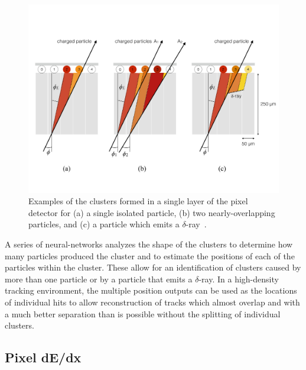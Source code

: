 \begin{figure}
\includegraphics[width=\fullfig]{figures/pixel_cluster_types.pdf}
\caption{Examples of the clusters formed in a single layer of the pixel detector for (a) a single isolated particle, (b) two nearly-overlapping particles, and (c) a particle which emits a $\delta$-ray~\cite{pixel_nn}.}
\label{fig:pixel_cluster_types}
\end{figure}

A series of neural-networks analyzes the shape of the clusters to determine how many particles produced the cluster and to estimate the positions of each of the particles within the cluster.
These allow for an identification of clusters caused by more than one particle or by a particle that emits a $\delta$-ray.
In a high-density tracking environment, the multiple position outputs can be used as the locations of individual hits to allow reconstruction of tracks which almost overlap and with a much better separation than is possible without the splitting of individual clusters.

\subsection{Pixel dE/dx}
\label{sec:pixel_dedx}

